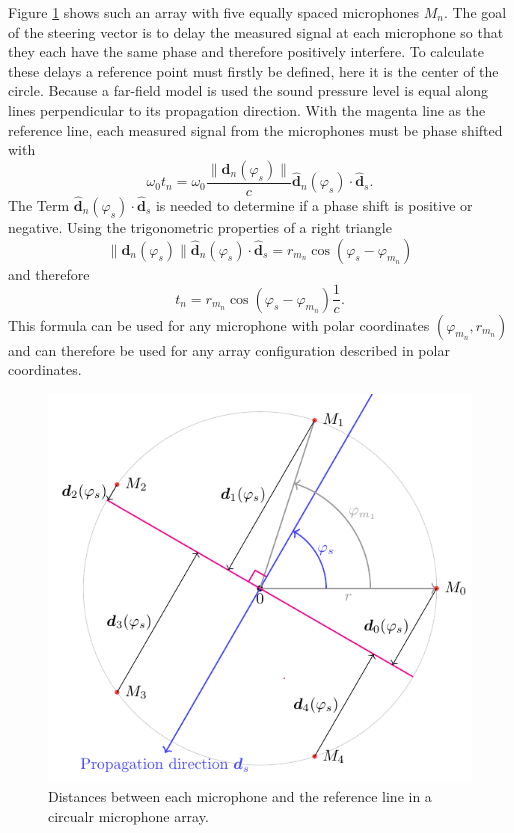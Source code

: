 Figure \ref*{ssl:fig:steering} shows such an array with five equally spaced microphones $M_n$.
The goal of the steering vector is to delay the measured signal at each microphone so that
they each have the same phase and therefore positively interfere.
To calculate these delays a reference point must firstly be defined, here it is the center of the circle.
Because a far-field model is used the sound pressure level is equal along lines perpendicular
to its propagation direction.
With the magenta line as the reference line, each measured signal from the microphones must be
phase shifted with 
\begin{equation}
  \omega_0 t_n = 
  \omega_0 \frac{
    \lVert\bm{d}_n(\varphi_s)\rVert}
    {c} 
    \hat{\bm{d}}_n(\varphi_s) \cdot \hat{\bm{d}}_s.
\end{equation}
The Term $\hat{\bm{d}}_n(\varphi_s) \cdot \hat{\bm{d}}_s$ is needed to determine
if a phase shift is positive or negative.
Using the trigonometric properties of a right triangle
\begin{equation}
  \lVert\bm{d}_n(\varphi_s)\rVert \hat{\bm{d}}_n(\varphi_s) \cdot \hat{\bm{d}}_s = r_{m_n} \cos(\varphi_s - \varphi_{m_n})
\end{equation}
and therefore
\begin{equation}
  t_n = 
  r_{m_n} \cos(\varphi_s - \varphi_{m_n})
  \frac{1}{c}.
  \label{ssl:eq:beamr2}
\end{equation}
This formula can be used for any microphone with polar coordinates
$(\varphi_{m_n}, r_{m_n})$ and can therefore be used for any array configuration
described in polar coordinates.
\begin{figure}
  \centering
  \includegraphics[]{steering_vector.pdf}
  \caption{Distances between each microphone and the reference line in 
  a circualr microphone array.}
  \label{ssl:fig:steering}
\end{figure}

